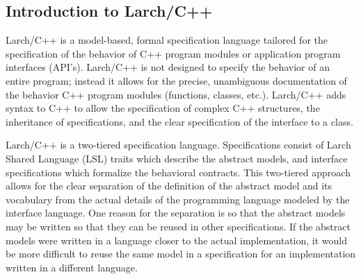 \documentclass[12pt]{article} %
\begin{document}


\subsection{Introduction to Larch/C++}
\label{lcppintro}
Larch/C++ \cite{Leavens96c} is a model-based, formal specification language tailored for
the specification of the behavior of C++ program modules or
application program interfaces (API's). Larch/C++ is not designed to
specify the 
behavior of an entire program; instead it allows for the precise,
unambiguous documentation of the behavior C++ program modules
(functions, classes, etc.). Larch/C++ adds syntax to C++ to allow the
specification of complex C++ structures, the inheritance of
specifications, and the clear specification of the interface to a
class.

Larch/C++ is a two-tiered specification language. Specifications
consist of Larch Shared Language (LSL) \cite{Guttag-Horning93} traits
which describe the abstract models, and interface specifications which
formalize the behavioral contracts. This two-tiered approach allows
for the clear separation of the definition of the abstract model and its
vocabulary from the actual details of the programming language modeled
by the interface language. One reason for the separation is so that
the abstract models may be written so that they can be reused in other
specifications. If the abstract models were written in a language
closer to the actual implementation, it would be more difficult to
reuse the same model in a specification for an implementation written
in a different language.
\end{document}
